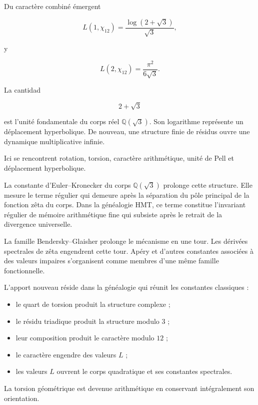 Du caractère combiné émergent\par

\[
L(1,\chi_{12})
=
\frac{\log(2+\sqrt3)}{\sqrt3},
\]

y\par

\[
L(2,\chi_{12})
=
\frac{\pi^2}{6\sqrt3}.
\]

La cantidad\par

\[
2+\sqrt3
\]

est l’unité fondamentale du corps réel \(\mathbb Q(\sqrt3)\). Son logarithme représente un déplacement hyperbolique. De nouveau, une structure finie de résidus ouvre une dynamique multiplicative infinie.\par

Ici se rencontrent rotation, torsion, caractère arithmétique, unité de Pell et déplacement hyperbolique.\par

La constante d’Euler–Kronecker du corps \(\mathbb Q(\sqrt3)\) prolonge cette structure. Elle mesure le terme régulier qui demeure après la séparation du pôle principal de la fonction zêta du corps. Dans la généalogie HMT, ce terme constitue l’invariant régulier de mémoire arithmétique fine qui subsiste après le retrait de la divergence universelle.\par

La famille Bendersky–Glaisher prolonge le mécanisme en une tour. Les dérivées spectrales de zêta engendrent cette tour. Apéry et d’autres constantes associées à des valeurs impaires s’organisent comme membres d’une même famille fonctionnelle.\par

L’apport nouveau réside dans la généalogie qui réunit les constantes classiques :\par

\begin{itemize}[leftmargin=*,itemsep=0.35em]
\item le quart de torsion produit la structure complexe ;
\item le résidu triadique produit la structure modulo \(3\) ;
\item leur composition produit le caractère modulo \(12\) ;
\item le caractère engendre des valeurs \(L\) ;
\item les valeurs \(L\) ouvrent le corps quadratique et ses constantes spectrales.
\end{itemize}

La torsion géométrique est devenue arithmétique en conservant intégralement son orientation.\par
